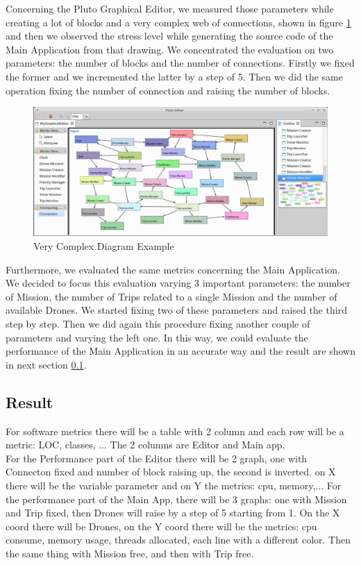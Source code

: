 Concerning the Pluto Graphical Editor, we measured those parameters while creating a lot of blocks and a very complex web of connections, shown in figure \ref{fig:stressDiagram} and then we observed the stress level while generating the source code of the Main Application from that drawing. We concentrated the evaluation on two parameters: the number of blocks and the number of connections. Firstly we fixed the former and we incremented the latter by a step of 5. Then we did the same operation fixing the number of connection and raising the number of blocks.

\begin{figure}[H]
  \centering
  \includegraphics[width=\linewidth]{pictures/stressDiagram.png}
  \caption{Very Complex Diagram Example}
  \label{fig:stressDiagram}
\end{figure}

Furthermore, we evaluated the same metrics concerning the Main Application. We decided to focus this evaluation varying 3 important parameters: the number of Mission, the number of Trips related to a single Mission and the number of available Drones. We started fixing two of these parameters and raised the third step by step. Then we did again this procedure fixing another couple of parameters and varying the left one. In this way, we could evaluate the performance of the Main Application in an accurate way and the result are shown in next section \ref{metricsResult}.

\subsection{Result}
\label{metricsResult}

For software metrics there will be a table with 2 column and each row will be a metric: LOC, classes, ... The 2 columns are Editor and Main app.
\\
For the Performance part of the Editor there will be 2 graph, one with Connecton fixed and number of block raising up, the second is inverted. on X there will be the variable parameter and on Y the metrics: cpu, memory,...
For the performance part of the Main App, there will be 3 graphs: one with Mission and Trip fixed, then Drones will raise by a step of 5 starting from 1. On the X coord there will be Drones, on the Y coord there will be the metrics: cpu consume, memory usage, threads allocated, each line with a different color.
Then the same thing with Mission free, and then with Trip free.



